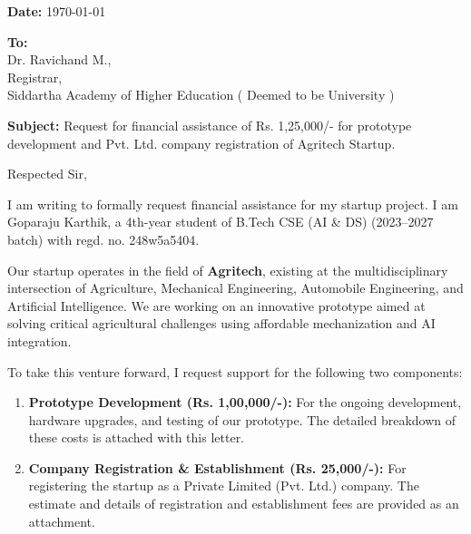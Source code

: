 \documentclass[12pt,a4paper]{article}
\begin{document}
\pagestyle{empty}

\begin{flushright}
    \textbf{Date:} \today \\
\end{flushright}

\begin{flushleft}
    \textbf{To:} \\
    Dr. Ravichand M., \\
    Registrar, \\
    Siddartha Academy of Higher Education ( Deemed to be University ) \\
\end{flushleft}

\vspace{0.5em}

\noindent\textbf{Subject:} Request for financial assistance of Rs. 1,25,000/- for prototype development and Pvt. Ltd. company registration of Agritech Startup.

\vspace{0.8em}

\noindent Respected Sir,

\vspace{0.5em}

I am writing to formally request financial assistance for my startup project. I am Goparaju Karthik, a 4th-year student of B.Tech CSE (AI \& DS) (2023--2027 batch) with regd. no. 248w5a5404.

Our startup operates in the field of \textbf{Agritech}, existing at the multidisciplinary intersection of Agriculture, Mechanical Engineering, Automobile Engineering, and Artificial Intelligence. We are working on an innovative prototype aimed at solving critical agricultural challenges using affordable mechanization and AI integration.

To take this venture forward, I request support for the following two components:
\begin{enumerate}
    \item \textbf{Prototype Development (Rs. 1,00,000/-):} For the ongoing development, hardware upgrades, and testing of our prototype. The detailed breakdown of these costs is attached with this letter.
    \item \textbf{Company Registration \& Establishment (Rs. 25,000/-):} For registering the startup as a Private Limited (Pvt. Ltd.) company. The estimate and details of registration and establishment fees are provided as an attachment.
\end{enumerate}
\end{document}
